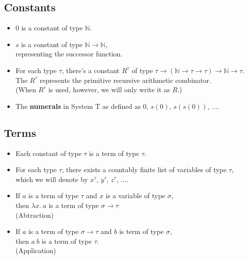 \documentclass[10pt]{article}
\begin{document}
	\subsection{Constants}
	
	\begin{itemize}
	  \item $0$ is a constant of type $\mathbb{N}$.
	  \item $s$ is a constant of type $\mathbb{N} \rightarrow \mathbb{N}$,\\
	    representing the successor function.
	  \item For each type $\tau$, there's a constant $R^{\tau}$ of type $\tau \rightarrow (\mathbb{N} \rightarrow \tau \rightarrow \tau) \rightarrow \mathbb{N} \rightarrow \tau.$\\	    
	    The $R^\tau$ represents the primitive recursive arithmetic combinator.\\
	    (When $R^\tau$ is used, however, we will only write it as $R$.)
	    
	  \item The {\bf numerals} in System T as defined as $0$, $s(0)$, $s(s(0))$, $\dotsc$.
	\end{itemize}
	
	\subsection{Terms}
	
	\begin{itemize}
	  \item Each constant of type $\tau$ is a term of type $\tau$.
	  
	  \item For each type $\tau$, there exists a countably finite list of variables of type $\tau$,\\
	    which we will denote by $x^\tau$, $y^\tau$, $z^\tau$, $\dotsc$.
	    
	  \item If $a$ is a term of type $\tau$ and $x$ is a variable of type $\sigma$,\\
	    then $\lambda x.\ a$ is a term of type $\sigma \rightarrow \tau$\\
	    (Abtraction)
	    
	  \item If $a$ is a term of type $\sigma \rightarrow \tau$ and $b$ is term of type $\sigma$,\\
	    then $a\ b$ is a term of type $\tau.$\\
	    (Application)
	\end{itemize}
	
\end{document}
